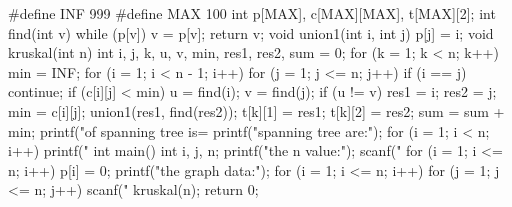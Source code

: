 #define INF 999 
#define MAX 100 
int p[MAX], c[MAX][MAX], t[MAX][2]; 
int find(int v) 
{ 
while (p[v]) 
v = p[v]; 
return v; 
} 
void union1(int i, int j) 
{ 
p[j] = i; 
} 
void kruskal(int n) 
{ 
int i, j, k, u, v, min, res1, res2, sum = 0; 
for (k = 1; k < n; k++) 
{ 
min = INF; 
for (i = 1; i < n - 1; i++) 
{ 
for (j = 1; j <= n; j++) 
{ 
if (i == j) continue; 
if (c[i][j] < min) 
{ 
u = find(i); 
v = find(j); 
if (u != v) 
{ 
res1 = i; 
res2 = j; 
min = c[i][j]; 
} 
} 
} 
} 
union1(res1, find(res2)); 
t[k][1] = res1; 
t[k][2] = res2; 
sum = sum + min; 
} 
printf("\nCost of spanning tree is=%
printf("\nEdgesof spanning tree are:\n"); 
for (i = 1; i < n; i++) 
printf("%
} 
int main() 
{ 
int i, j, n; 
printf("\nEnter the n value:"); 
scanf("%
for (i = 1; i <= n; i++) 
p[i] = 0; 
printf("\nEnter the graph data:\n"); 
for (i = 1; i <= n; i++) 
for (j = 1; j <= n; j++) 
scanf("%
kruskal(n); 
return 0; 
} 
